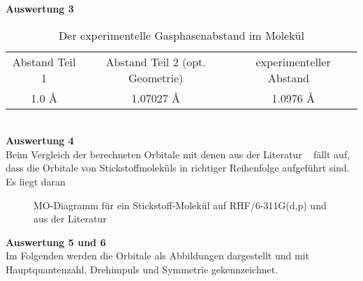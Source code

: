 \documentclass[12pt]{article}
\begin{document}
\begin{onehalfspace}
\textbf{Auswertung 3}\\
\begin{table}[!htpb]
\centering
\caption{Der experimentelle Gasphasenabstand im  Molekül }
\begin{tabular}{ccc}
\toprule
Abstand Teil 1 & Abstand Teil 2 (opt. Geometrie)  & experimenteller Abstand ~\cite{holleman} \\
1.0 \si{\angstrom} & 1.07027 \si{\angstrom} & 1.0976 \si{\angstrom} \\
\midrule
\bottomrule
\end{tabular}
\end{table}\\
\noindent
\textbf{Auswertung 4}\\


Beim Vergleich der berechneten Orbitale mit denen aus der Literatur ~\cite{ritaatom} fällt auf,
 dass die Orbitale von Stickstoffmoleküls in richtiger Reihenfolge aufgeführt sind. Es liegt daran

\begin{figure}[!hptb]


\caption{MO-Diagramm für ein Stickstoff-Molekül auf RHF/6-311G(d,p) und aus der Literatur ~\cite{ritaatom}}

\end{figure}





\textbf{Auswertung 5 und 6} \\
Im Folgenden werden die Orbitale als
Abbildungen dargestellt und mit Hauptquantenzahl, Drehimpuls und Symmetrie
gekennzeichnet.
\begin{figure}[!hptb]
    \centering
    \begin{subfigure}[b]{0.4\textwidth}
    \end{subfigure}
    \begin{subfigure}[b]{0.4\textwidth}
    \end{subfigure}

\end{figure}

\begin{figure}[!hptb]
    \centering
    \begin{subfigure}[b]{0.4\textwidth}
    \end{subfigure}
    ~ %
    \begin{subfigure}[b]{0.4\textwidth}
    \end{subfigure}


\end{figure}
\end{onehalfspace}
\end{document}
